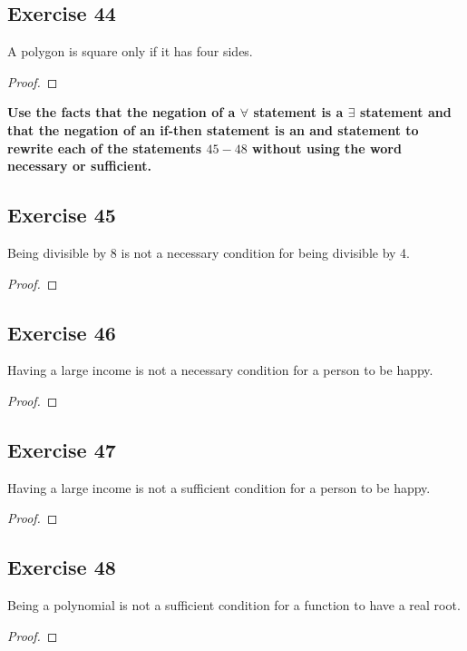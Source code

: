 \documentclass[14pt]{extarticle}
\newcommand{\fa}{\forall}
\newcommand{\te}{\exists}
\begin{document}
\subsection{Exercise 44}
A polygon is square only if it has four sides.

\begin{proof}

\end{proof}

{\bf \color{cyan} Use the facts that the negation of a $\fa$ statement is a $\te$ statement and that the negation of an if-then statement is an and statement to rewrite each of the statements $45-48$ without using the word necessary or sufficient.}

\subsection{Exercise 45}
Being divisible by 8 is not a necessary condition for being divisible by 4.

\begin{proof}

\end{proof}

\subsection{Exercise 46}
Having a large income is not a necessary condition for a person to be happy.

\begin{proof}

\end{proof}

\subsection{Exercise 47}
Having a large income is not a sufficient condition for a person to be happy.

\begin{proof}

\end{proof}

\subsection{Exercise 48}
Being a polynomial is not a sufficient condition for a function to have a real root.

\begin{proof}

\end{proof}
\end{document}
